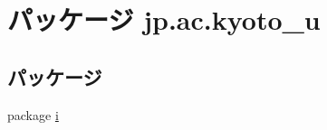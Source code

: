 \hypertarget{namespacejp_1_1ac_1_1kyoto__u}{\section{パッケージ jp.\-ac.\-kyoto\-\_\-u}
\label{namespacejp_1_1ac_1_1kyoto__u}
}
\subsection*{パッケージ}
\begin{DoxyCompactItemize}
\item 
package \hyperlink{namespacejp_1_1ac_1_1kyoto__u_1_1i}{i}
\end{DoxyCompactItemize}
